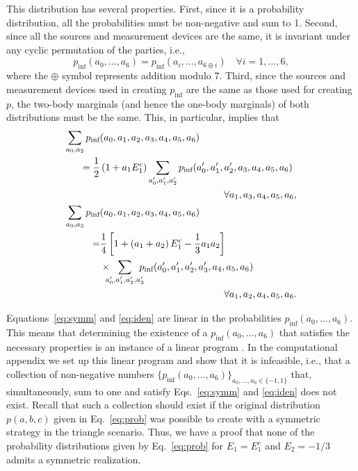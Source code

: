 \documentclass[aps,physrev,reprint,superscriptaddress,nofootinbib,twocolumn]{revtex4-2}
\begin{document}
This distribution has several properties.
First, since it is a probability distribution, all the probabilities must be non-negative and sum to 1.
Second, since all the sources and measurement devices are the same, it is invariant under any cyclic permutation of the parties, i.e.,
\begin{equation}
    p_\text{inf}(a_0,\dots,a_6)=p_\text{inf}(a_{i},\dots,a_{6\oplus i})\quad\forall i=1,\dots,6,
    \label{eq:symm}
\end{equation}
where the $\oplus$ symbol represents addition modulo 7.
Third, since the sources and measurement devices used in creating $p_\text{inf}$ are the same as those used for creating $p$, the two-body marginals (and hence the one-body marginals) of both distributions must be the same.
This, in particular, implies that
\begin{equation}
    \begin{aligned}
        \sum_{a_0,a_2}p_\text{inf}&(a_0,a_1,a_2,a_3,a_4,a_5,a_6)\\
        =\frac{1}{2}&\left(1+a_1 E_1^c\right)\sum_{a'_0,a'_1,a'_2}p_\text{inf}(a'_0,a'_1,a_2',a_3,a_4,a_5,a_6)\\
        &\hspace{4.5cm}\forall a_1,a_3,a_4,a_5,a_6,\\
        \sum_{a_0,a_3}p_\text{inf}&(a_0,a_1,a_2,a_3,a_4,a_5,a_6)\\
        =&\frac{1}{4}\left[1+\left(a_1+a_2\right)E_1^c-\frac{1}{3}a_1 a_2\right]\\
        &\times\!\!\!\!\sum_{a'_0,a'_1,a'_2,a'_3}\!\!\!\!p_\text{inf}(a'_0,a_1',a_2',a_3',a_4,a_5,a_6)\\
        &\hspace{4.5cm}\forall a_1,a_2,a_4,a_5,a_6.
    \end{aligned}
    \label{eq:iden}
\end{equation}

Equations~\eqref{eq:symm} and \eqref{eq:iden} are linear in the probabilities $p_\text{inf}(a_0,\dots,a_6)$.
This means that determining the existence of a $p_\text{inf}(a_0,\dots,a_6)$ that satisfies the necessary properties is an instance of a linear program \cite{boydbook}.
In the computational appendix \cite{compapp} we set up this linear program and show that it is infeasible, i.e., that a collection of non-negative numbers $\{p_\text{inf}(a_0,\dots,a_6)\}_{a_0,\dots,a_6\in\{-1,1\}}$ that, simultaneously, sum to one and satisfy Eqs.~\eqref{eq:symm} and \eqref{eq:iden} does not exist.
Recall that such a collection should exist if the original distribution $p(a,b,c)$ given in Eq.~\eqref{eq:prob} was possible to create with a symmetric strategy in the triangle scenario.
Thus, we have a proof that none of the probability distributions given by Eq.~\eqref{eq:prob} for $E_1=E_1^c$ and $E_2=-1/3$ admits a symmetric realization.
\end{document}
